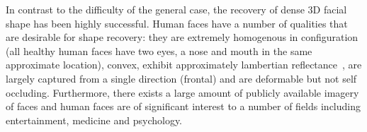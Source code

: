 In contrast to the difficulty of the general case, the recovery of dense 3D
facial shape has been highly successful. Human faces have a number of qualities
that are desirable for shape recovery: they are extremely homogenous in
configuration (all healthy human faces have two eyes, a nose and mouth in the
same approximate location), convex, exhibit approximately lambertian 
reflectance~\cite{Sirovich:1987te,RefWorks:314,Basri:2003ie,RefWorks:98,Hallinan:1994dz,ramamoorthi2002analytic,ramamoorthi2001relationship,shashua1997photometric,moses1993face},
are largely captured from a single direction (frontal) and are deformable
but not self occluding. Furthermore, there exists a large amount of publicly
available imagery of faces and human faces are of significant interest to a 
number of fields including entertainment, medicine and psychology.
